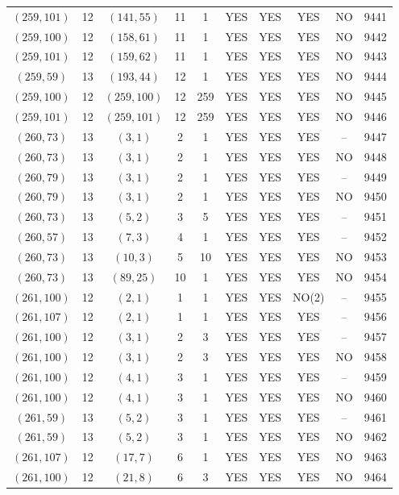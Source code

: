 \begin{longtable}{|c|c|c|c|c|c|c|c|c|c|}
$(259, 101)$ & 12 & $(141, 55)$ & 11 & 1 & YES & YES & YES & NO & 9441\\
$(259, 100)$ & 12 & $(158, 61)$ & 11 & 1 & YES & YES & YES & NO & 9442\\
$(259, 101)$ & 12 & $(159, 62)$ & 11 & 1 & YES & YES & YES & NO & 9443\\
$(259, 59)$ & 13 & $(193, 44)$ & 12 & 1 & YES & YES & YES & NO & 9444\\
$(259, 100)$ & 12 & $(259, 100)$ & 12 & 259 & YES & YES & YES & NO & 9445\\
$(259, 101)$ & 12 & $(259, 101)$ & 12 & 259 & YES & YES & YES & NO & 9446\\
$(260, 73)$ & 13 & $(3, 1)$ & 2 & 1 & YES & YES & YES & -- & 9447\\
$(260, 73)$ & 13 & $(3, 1)$ & 2 & 1 & YES & YES & YES & NO & 9448\\
$(260, 79)$ & 13 & $(3, 1)$ & 2 & 1 & YES & YES & YES & -- & 9449\\
$(260, 79)$ & 13 & $(3, 1)$ & 2 & 1 & YES & YES & YES & NO & 9450\\
$(260, 73)$ & 13 & $(5, 2)$ & 3 & 5 & YES & YES & YES & -- & 9451\\
$(260, 57)$ & 13 & $(7, 3)$ & 4 & 1 & YES & YES & YES & -- & 9452\\
$(260, 73)$ & 13 & $(10, 3)$ & 5 & 10 & YES & YES & YES & NO & 9453\\
$(260, 73)$ & 13 & $(89, 25)$ & 10 & 1 & YES & YES & YES & NO & 9454\\
$(261, 100)$ & 12 & $(2, 1)$ & 1 & 1 & YES & YES & NO(2) & -- & 9455\\
$(261, 107)$ & 12 & $(2, 1)$ & 1 & 1 & YES & YES & YES & -- & 9456\\
$(261, 100)$ & 12 & $(3, 1)$ & 2 & 3 & YES & YES & YES & -- & 9457\\
$(261, 100)$ & 12 & $(3, 1)$ & 2 & 3 & YES & YES & YES & NO & 9458\\
$(261, 100)$ & 12 & $(4, 1)$ & 3 & 1 & YES & YES & YES & -- & 9459\\
$(261, 100)$ & 12 & $(4, 1)$ & 3 & 1 & YES & YES & YES & NO & 9460\\
$(261, 59)$ & 13 & $(5, 2)$ & 3 & 1 & YES & YES & YES & -- & 9461\\
$(261, 59)$ & 13 & $(5, 2)$ & 3 & 1 & YES & YES & YES & NO & 9462\\
$(261, 107)$ & 12 & $(17, 7)$ & 6 & 1 & YES & YES & YES & NO & 9463\\
$(261, 100)$ & 12 & $(21, 8)$ & 6 & 3 & YES & YES & YES & NO & 9464\\

\end{longtable}
